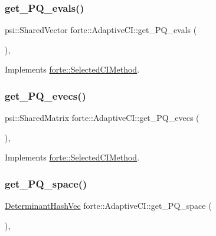 \subsubsection{\texorpdfstring{get\+\_\+\+P\+Q\+\_\+evals()}{get\_PQ\_evals()}}
{\footnotesize\ttfamily psi\+::\+Shared\+Vector forte\+::\+Adaptive\+C\+I\+::get\+\_\+\+P\+Q\+\_\+evals (\begin{DoxyParamCaption}{ }\end{DoxyParamCaption})\hspace{0.3cm}{\ttfamily [override]}, {\ttfamily [virtual]}}



Implements \mbox{\hyperlink{classforte_1_1_selected_c_i_method_a675d28ae66341b8cfabb2953c936621c}{forte\+::\+Selected\+C\+I\+Method}}.

\mbox{\label{classforte_1_1_adaptive_c_i_ab96222faf4f633fac906b24c7b68d288}} 
\subsubsection{\texorpdfstring{get\+\_\+\+P\+Q\+\_\+evecs()}{get\_PQ\_evecs()}}
{\footnotesize\ttfamily psi\+::\+Shared\+Matrix forte\+::\+Adaptive\+C\+I\+::get\+\_\+\+P\+Q\+\_\+evecs (\begin{DoxyParamCaption}{ }\end{DoxyParamCaption})\hspace{0.3cm}{\ttfamily [override]}, {\ttfamily [virtual]}}



Implements \mbox{\hyperlink{classforte_1_1_selected_c_i_method_a5e5212836aa0dc35f98238d1f426abed}{forte\+::\+Selected\+C\+I\+Method}}.

\mbox{\label{classforte_1_1_adaptive_c_i_af7e800fcfe0d1c2b674cf8cd2c4f41d0}} 
\subsubsection{\texorpdfstring{get\+\_\+\+P\+Q\+\_\+space()}{get\_PQ\_space()}}
{\footnotesize\ttfamily \mbox{\hyperlink{classforte_1_1_determinant_hash_vec}{Determinant\+Hash\+Vec}} forte\+::\+Adaptive\+C\+I\+::get\+\_\+\+P\+Q\+\_\+space (\begin{DoxyParamCaption}{ }\end{DoxyParamCaption})\hspace{0.3cm}{\ttfamily [override]}, {\ttfamily [virtual]}}



